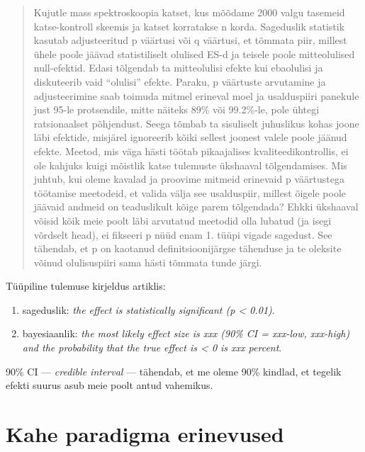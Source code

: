 \documentclass[]{book}
\begin{document}
\begin{quote}
Kujutle mass spektroskoopia katset, kus mõõdame 2000 valgu tasemeid
katse-kontroll skeemis ja katset korratakse n korda. Sageduslik
statistik kasutab adjusteeritud p väärtusi või q väärtusi, et tõmmata
piir, millest ühele poole jäävad statistiliselt olulised ES-d ja teisele
poole mitteolulised null-efektid. Edasi tõlgendab ta mitteolulisi efekte
kui ebaolulisi ja diskuteerib vaid ``olulisi'' efekte. Paraku, p
väärtuste arvutamine ja adjusteerimine saab toimuda mitmel erineval moel
ja usalduspiiri panekule just 95-le protsendile, mitte näiteks 89\% või
99.2\%-le, pole ühtegi ratsionaalset põhjendust. Seega tõmbab ta
sisuliselt juhuslikus kohas joone läbi efektide, misjärel ignoreerib
kõiki sellest joonest valele poole jäänud efekte. Meetod, mis väga hästi
töötab pikaajalises kvaliteedikontrollis, ei ole kahjuks kuigi mõistlik
katse tulemuste ükshaaval tõlgendamises. Mis juhtub, kui oleme kavalad
ja proovime mitmeid erinevaid p väärtustega töötamise meetodeid, et
valida välja see usalduspiir, millest õigele poole jäävaid andmeid on
teaduslikult kõige parem tõlgendada? Ehkki ükshaaval võisid kõik meie
poolt läbi arvutatud meetodid olla lubatud (ja isegi võrdselt head), ei
fikseeri p nüüd enam 1. tüüpi vigade sagedust. See tähendab, et p on
kaotanud definitsioonijärgse tähenduse ja te oleksite võinud
olulisuspiiri sama hästi tõmmata tunde järgi.
\end{quote}

Tüüpiline tulemuse kirjeldus artiklis:

\begin{enumerate}
\def\labelenumi{\arabic{enumi}.}
\item
  sageduslik: \emph{the effect is statistically significant (p
  \textless{} 0.01)}.
\item
  bayesiaanlik: \emph{the most likely effect size is xxx (90\% CI =
  xxx-low, xxx-high) and the probability that the true effect is
  \textless{} 0 is xxx percent}.
\end{enumerate}

90\% CI --- \emph{credible interval} --- tähendab, et me oleme 90\%
kindlad, et tegelik efekti suurus asub meie poolt antud vahemikus.

\section*{Kahe paradigma erinevused}\label{kahe-paradigma-erinevused-1}
\end{document}
